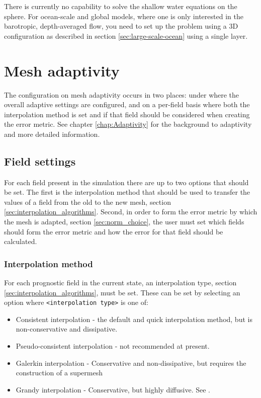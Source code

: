 There is currently no capability to solve the shallow water equations on the
sphere. For ocean-scale and global models, where one is only interested in the
barotropic, depth-averaged flow, you need to set up the problem using a 3D
configuration as described in section \ref{sec:large-scale-ocean} using a
single layer.

\section{Mesh adaptivity} \label{sec:config_adapt}

The configuration on mesh adaptivity occurs in two places: under  where
the overall adaptive settings are configured, and on a per-field basis where both the interpolation
method is set and if that field should be considered when creating the error metric. See chapter
\ref{chap:Adaptivity} for the background to adaptivity and more detailed information.

\subsection{Field settings}

For each field present in the simulation there are up to two options that should be set. The first
is the interpolation method that should be used to transfer the values of a field from the old to the new mesh, section \ref{sec:interpolation_algorithms}.
Second, in order to form the error metric by which the mesh is adapted, section \ref{sec:norm_choice}, the user must set which fields
should form the error metric and how the error for that field should be calculated.

\subsubsection{Interpolation method} \label{sec:config_adapt_interp}

For each prognostic field in the current state, an interpolation type, section \ref{sec:interpolation_algorithms}, must be set. These can be set by selecting an
option  where \texttt{<interpolation type>} is one of:
\begin{itemize}
\item Consistent interpolation - the default and quick interpolation method, but is non-conservative and dissipative.
\item Pseudo-consistent interpolation - not recommended at present.
\item Galerkin interpolation - Conservative and non-dissipative, but requires the construction of a supermesh \citep{farrell2009a,farrell2010a}
\item Grandy interpolation - Conservative, but highly diffusive. See \citet{grandy1999}.
\end{itemize}

